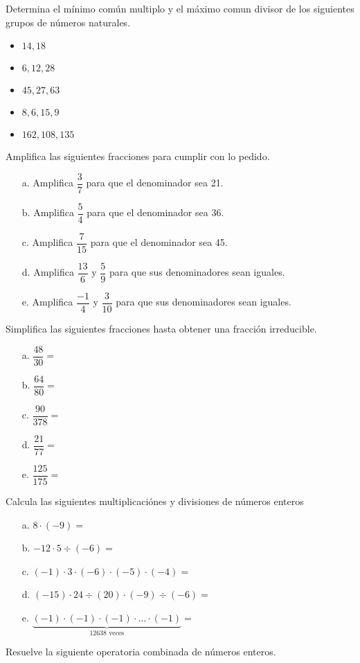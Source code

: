 \documentclass[spanish,letterpaper, 11pt, addpoints, answers]{exam}
\begin{document}
\begin{questions}

\question Determina el mínimo común multiplo y el máximo comun divisor de los siguientes grupos de números naturales.

\begin{itemize}
  \item $14,18$
  \item $6,12,28$
  \item $45,27,63$
  \item $8,6,15,9$
  \item $162,108,135$
\end{itemize}

\question Amplifica las siguientes fracciones para cumplir con lo pedido.

  \begin{itemize}
  \item[a.]Amplifica $\dfrac{3}{7}$ para que el denominador sea 21.
  \item[b.]Amplifica $\dfrac{5}{4}$ para que el denominador sea 36.
  \item[c.]Amplifica $\dfrac{7}{15}$ para que el denominador sea 45.
  \item[d.]Amplifica $\dfrac{13}{6}$ y $\dfrac{5}{9}$ para que sus denominadores sean iguales.
  \item[e.]Amplifica $\dfrac{-1}{4}$ y $\dfrac{3}{10}$ para que sus denominadores sean iguales.
  \end{itemize}

  \question Simplifica las siguientes fracciones hasta obtener una fracción irreducible.
  
  \begin{itemize}
  \item[a.]$\dfrac{48}{30}=$
  \item[b.]$\dfrac{64}{80}=$
  \item[c.]$\dfrac{90}{378}=$
  \item[d.]$\dfrac{21}{77}=$
  \item[e.]$\dfrac{125}{175}=$
  \end{itemize}

  \question Calcula las siguientes multiplicaciónes y divisiones de números enteros

  \begin{itemize}
  \item[a. ]$8\cdot (-9) =$
  \item[b. ]$-12\cdot 5\div (-6) =$
  \item[c. ]$(-1)\cdot 3\cdot (-6)\cdot (-5)\cdot (-4)=$
  \item[d. ]$(-15)\cdot 24\div(20)\cdot (-9)\div (-6) =$
  \item[e. ]$\underbrace{(-1)\cdot (-1)\cdot (-1)\cdot \ldots \cdot (-1)}_{\text{12638 veces}} =$
  \end{itemize}
  \newpage
  \question Resuelve la siguiente operatoria combinada de números enteros.
  

\end{questions}
\end{document}
